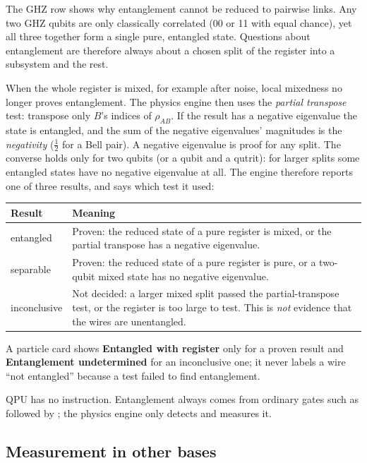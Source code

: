 The GHZ row shows why entanglement cannot be reduced to pairwise links. Any
two GHZ qubits are only classically correlated (00 or 11 with equal chance),
yet all three together form a single pure, entangled state. Questions about
entanglement are therefore always about a chosen split of the register into a
subsystem and the rest.

When the whole register is mixed, for example after noise, local mixedness no
longer proves entanglement. The physics engine then uses the \emph{partial
transpose} test: transpose only $B$'s indices of $\rho_{AB}$. If the result
has a negative eigenvalue the state is entangled, and the sum of the negative
eigenvalues' magnitudes is the \emph{negativity} ($\tfrac12$ for a Bell pair).
A negative eigenvalue is proof for any split. The converse holds only for two
qubits (or a qubit and a qutrit): for larger splits some entangled states have
no negative eigenvalue at all. The engine therefore reports one of three
results, and says which test it used:

\begin{center}
\begin{tabularx}{\textwidth}{l X}
\toprule
Result & Meaning\\
\midrule
entangled & Proven: the reduced state of a pure register is mixed, or the
partial transpose has a negative eigenvalue.\\
separable & Proven: the reduced state of a pure register is pure, or a
two-qubit mixed state has no negative eigenvalue.\\
inconclusive & Not decided: a larger mixed split passed the partial-transpose
test, or the register is too large to test. This is \emph{not} evidence that
the wires are unentangled.\\
\bottomrule
\end{tabularx}
\end{center}
A particle card shows \textbf{Entangled with register} only for a proven
result and \textbf{Entanglement undetermined} for an inconclusive one; it
never labels a wire ``not entangled'' because a test failed to find
entanglement.

QPU has no  instruction. Entanglement always comes from
ordinary gates such as  followed by ; the physics engine
only detects and measures it.

\subsection{Measurement in other bases}

